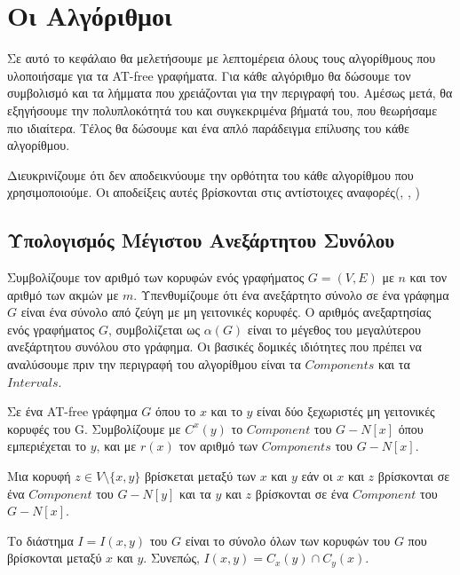 \chapter{Οι Αλγόριθμοι}
\label{ch:Algorithms}

Σε αυτό το κεφάλαιο θα μελετήσουμε με λεπτομέρεια όλους τους αλγορίθμους που υλοποιήσαμε για τα AT-free γραφήματα.
Για κάθε αλγόριθμο θα δώσουμε τον συμβολισμό και τα λήμματα που χρειάζονται για την περιγραφή του. Αμέσως μετά, θα εξηγήσουμε την πολυπλοκότητά του και συγκεκριμένα βήματά του, που θεωρήσαμε πιο ιδιαίτερα. Τέλος θα δώσουμε και ένα απλό παράδειγμα επίλυσης του κάθε αλγορίθμου.

Διευκρινίζουμε ότι δεν αποδεικνύουμε την ορθότητα του κάθε αλγορίθμου που χρησιμοποιούμε. Οι αποδείξεις αυτές βρίσκονται στις αντίστοιχες αναφορές(\cite{at-free-independent-sets}, \cite{at-free-domination}, \cite{at-free-3-colouring})   

\section{Υπολογισμός Μέγιστου Ανεξάρτητου Συνόλου}
\label{sec:Independent_Set_Alg}
Συμβολίζουμε τον αριθμό των κορυφών ενός γραφήματος $G = (V, E)$ με
$n$ και τον αριθμό των ακμών με $m$. 
Υπενθυμίζουμε ότι ένα ανεξάρτητο σύνολο σε ένα γράφημα $G$ είναι ένα σύνολο από ζεύγη με μη γειτονικές
κορυφές. Ο αριθμός ανεξαρτησίας ενός γραφήματος $G$, συμβολίζεται ως $\alpha(G)$ είναι το μέγεθος
του μεγαλύτερου ανεξάρτητου συνόλου στο γράφημα. Οι βασικές δομικές ιδιότητες που πρέπει να αναλύσουμε πριν την περιγραφή του αλγορίθμου είναι τα $Components$ και τα $Intervals$.


Σε ένα AT-free γράφημα $G$ όπου το $x$ και το $y$ είναι δύο ξεχωριστές μη γειτονικές κορυφές του G. Συμβολίζουμε με $C^{x}(y)$ το $Component$ του $G - N[x]$ όπου εμπεριέχεται το $y$, και με $r(x)$ τον αριθμό των $Components$ του $G - N[x]$.

\begin{definition}
	Μια κορυφή $z \in V \setminus \{x, y\}$ βρίσκεται μεταξύ των $x$ και $y$ εάν οι $x$ και $z$ βρίσκονται σε ένα $Component$ του $G - N [y]$ και τα $y$ και $z$ βρίσκονται σε ένα $Component$ του $G - N [x]$.
\end{definition}

\begin{definition}
	Το διάστημα $I = I(x, y)$ του $G$ είναι το σύνολο όλων των κορυφών του $G$ που βρίσκονται μεταξύ $x$ και $y$. Συνεπώς, $I(x, y) = C_x(y) \cap C_y(x)$.
\end{definition}

